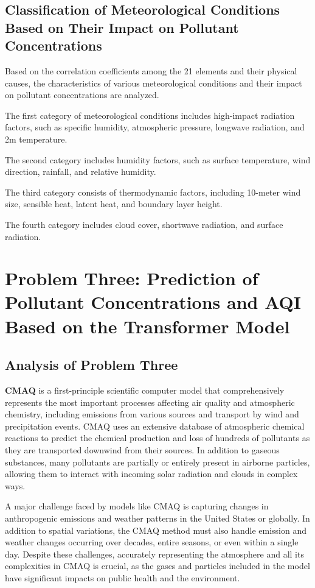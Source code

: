 \documentclass[12pt]{article}
\begin{document}
\subsection{Classification of Meteorological Conditions Based on Their Impact on Pollutant Concentrations}
Based on the correlation coefficients among the 21 elements and their physical causes, the characteristics of various meteorological conditions and their impact on pollutant concentrations are analyzed.

The first category of meteorological conditions includes high-impact radiation factors, such as specific humidity, atmospheric pressure, longwave radiation, and 2m temperature.

The second category includes humidity factors, such as surface temperature, wind direction, rainfall, and relative humidity.

The third category consists of thermodynamic factors, including 10-meter wind size, sensible heat, latent heat, and boundary layer height.

The fourth category includes cloud cover, shortwave radiation, and surface radiation.

\section{Problem Three: Prediction of Pollutant Concentrations and AQI Based on the Transformer Model}

\subsection{Analysis of Problem Three}
\textbf{CMAQ} is a first-principle scientific computer model that comprehensively represents the most important processes affecting air quality and atmospheric chemistry, including emissions from various sources and transport by wind and precipitation events. CMAQ uses an extensive database of atmospheric chemical reactions to predict the chemical production and loss of hundreds of pollutants as they are transported downwind from their sources. In addition to gaseous substances, many pollutants are partially or entirely present in airborne particles, allowing them to interact with incoming solar radiation and clouds in complex ways.

A major challenge faced by models like CMAQ is capturing changes in anthropogenic emissions and weather patterns in the United States or globally. In addition to spatial variations, the CMAQ method must also handle emission and weather changes occurring over decades, entire seasons, or even within a single day. Despite these challenges, accurately representing the atmosphere and all its complexities in CMAQ is crucial, as the gases and particles included in the model have significant impacts on public health and the environment.
\end{document}
